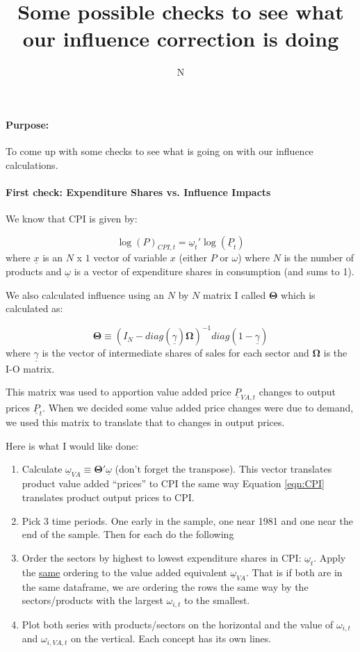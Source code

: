 \documentclass[12pt,english]{article}
\begin{document}
\title{Some possible checks to see what our influence correction is doing}
\author{N}
\maketitle


\paragraph{Purpose:} To come up with some checks to see what is going on with our influence calculations.

\paragraph{First check: Expenditure Shares vs. Influence Impacts}

We know that CPI is given by:

\begin{equation}
	\log(P)_{CPI,t} = \underline{\omega}_{t}'\log(\underline{P}_t)\label{eqn:CPI}
\end{equation}
where $\underline{x}$ is an $N$ x $1$ vector of variable $x$ (either $P$ or $\omega$) where $N$ is the number of products and $\underline{\omega}$ is a vector of expenditure shares in consumption (and sums to 1).

We also calculated influence using an $N$ by $N$ matrix I called $\mathbf{\Theta}$ which is calculated as:

\[
	\mathbf{\Theta}\equiv (I_N - diag(\underline{\gamma})\mathbf{\Omega})^{-1}diag(1-\underline{\gamma})
\]
where $\underline{\gamma}$ is the vector of intermediate shares of sales for each sector and $\mathbf{\Omega}$ is the I-O matrix.

This matrix was used to apportion value added price $\underline{P}_{VA,t}$ changes to output prices $\underline{P}_t$. When we decided some value added price changes were due to demand, we used this matrix to translate that to changes in output prices.

Here is what I would like done:

\begin{enumerate}
	\item Calculate $\underline{\omega}_{VA}\equiv \mathbf{\Theta}'\underline{\omega}$ (don't forget the transpose). This vector translates product value added ``prices'' to CPI the same way Equation \ref{eqn:CPI} translates product output prices to CPI.
	\item Pick 3 time periods. One early in the sample, one near 1981 and one near the end of the sample. Then for each do the following
	\item Order the sectors by highest to lowest expenditure shares in CPI: $\underline{\omega}_{t}$. Apply the \underline{same} ordering to the value added equivalent $\underline{\omega}_{VA}$. That is if both are in the same dataframe, we are ordering the rows the same way by the sectors/products with the largest $\omega_{i,t}$ to the smallest.
	\item Plot both series with products/sectors on the horizontal and the value of $\omega_{i,t}$ and $\omega_{i,VA,t}$ on the vertical. Each concept has its own lines.
\end{enumerate}
\end{document}
